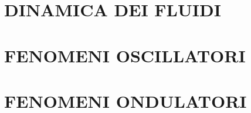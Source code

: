 \documentclass{article}
\begin{document}
	\section{DINAMICA DEI FLUIDI}
		\begin{multicols}{2}
\begin{comment}
			\begin{equation}  \end{equation}
			\begin{equation}  \end{equation}
			\begin{equation}  \end{equation}
			\begin{equation}  \end{equation}
\end{comment}
		\end{multicols}
	\section{FENOMENI OSCILLATORI}
		\begin{multicols}{2}
\begin{comment}
			\begin{equation}  \end{equation}
			\begin{equation}  \end{equation}
			\begin{equation}  \end{equation}
			\begin{equation}  \end{equation}
\end{comment}
		\end{multicols}
	\section{FENOMENI ONDULATORI}
		\begin{multicols}{2}
\begin{comment}
			\begin{equation}  \end{equation}
			\begin{equation}  \end{equation}
			\begin{equation}  \end{equation}
			\begin{equation}  \end{equation}
\end{comment}
		\end{multicols}
\end{document}
